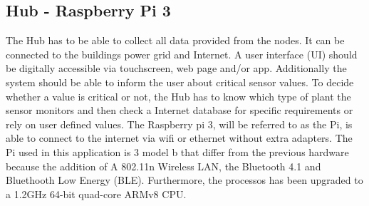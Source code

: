 \subsection{Hub - Raspberry Pi 3}
The Hub has to be able to collect all data provided from the nodes. It can be connected to the buildings power grid and Internet. A user interface (UI) should be digitally accessible via touchscreen, web page and/or app. Additionally the system should be able to inform the user about critical sensor values. To decide whether a value is critical or not, the Hub has to know which type of plant the sensor monitors and then check a Internet database for specific requirements or rely on user defined values.
The Raspberry pi 3, will be referred to as the Pi, is able to connect to the internet via wifi or ethernet without extra adapters. The Pi used in this application is 3 model b that differ from the previous hardware because the addition of A
802.11n Wireless LAN, the Bluetooth 4.1 and Bluethooth Low Energy (BLE). Furthermore, the processos has been upgraded to a 1.2GHz 64-bit quad-core ARMv8 CPU. \cite{pi}\\

